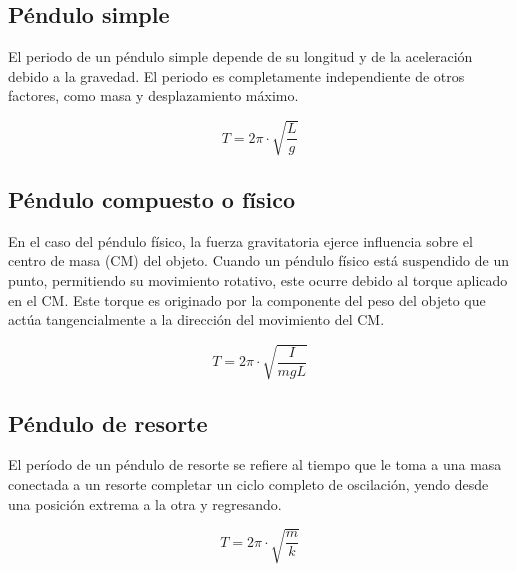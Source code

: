 \documentclass[twocolumn, 12pt]{article}
\begin{document}
\nocite{movimiento-armonico-simple}

\subsection{Péndulo simple}

El periodo de un péndulo simple depende de su longitud y de
la aceleración debido a la gravedad. El periodo es
completamente independiente de otros factores, como masa y
desplazamiento máximo.

{\large
\begin{equation}
    T = 2\pi \cdot \sqrt{\frac{L}{g}}
\end{equation}
}

\nocite{tipos-pendulos-1}

\subsection{Péndulo compuesto o físico}

En el caso del péndulo físico, la fuerza gravitatoria
ejerce influencia sobre el centro de masa (CM) del objeto.
Cuando un péndulo físico está suspendido de un punto,
permitiendo su movimiento rotativo, este ocurre debido al
torque aplicado en el CM\@. Este torque es originado por la
componente del peso del objeto que actúa tangencialmente a
la dirección del movimiento del CM\@.

{\large
\begin{equation}
    T = 2\pi \cdot \sqrt{\frac{I}{m g L}}
    \label{eq:T-pendulo-fisico}
\end{equation}
}

\nocite{tipos-pendulos-1}

\subsection{Péndulo de resorte}

El período de un péndulo de resorte se refiere al tiempo
que le toma a una masa conectada a un resorte completar un
ciclo completo de oscilación, yendo desde una posición
extrema a la otra y regresando.

    {\large
        \begin{equation}
            T = 2\pi \cdot \sqrt{\frac{m}{k}}
        \end{equation}
    }
\end{document}
